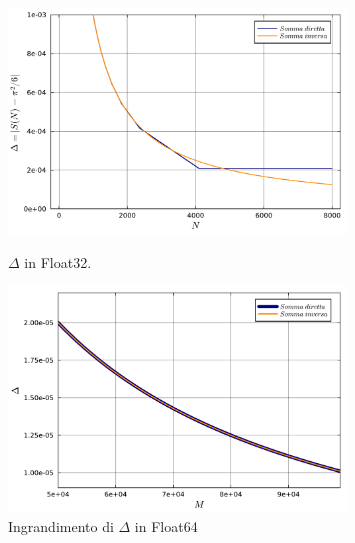 \documentclass[letterpaper, 12pt]{article}
\numberwithin{equation}{section}    %
\begin{document}
\begin{figure}[!ht]
    \begin{minipage}[b]{0.49\textwidth}
        \centering
        \includegraphics[width=0.8\textwidth]{1211.pdf}
        \caption{$\Delta$ in Float32.}
        \label{fig:es1_2_1_1}
    \end{minipage}
    \centering
    \begin{minipage}[b]{0.49\textwidth}
        \centering
        \includegraphics[width=0.8\textwidth]{1212.pdf}
        \caption{Ingrandimento di $\Delta$ in Float64}
        \label{fig:es1_2_1_2}
    \end{minipage}
\end{figure}
\end{document}
